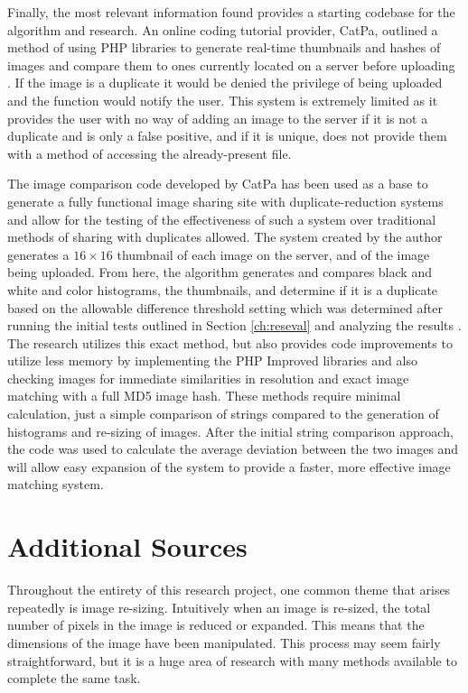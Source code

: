 Finally, the most relevant information found provides a starting codebase for the algorithm and research. An online coding tutorial provider, CatPa, outlined a method of using PHP libraries to generate real-time thumbnails and hashes of images and compare them to ones currently located on a server before uploading \cite{catpa:gdcode}. If the image is a duplicate it would be denied the privilege of being uploaded and the function would notify the user. This system is extremely limited as it provides the user with no way of adding an image to the server if it is not a duplicate and is only a false positive, and if it is unique, does not provide them with a method of accessing the already-present file.

The image comparison code developed by CatPa has been used as a base to generate a fully functional image sharing site with duplicate-reduction systems and allow for the testing of the effectiveness of such a system over traditional methods of sharing with duplicates allowed. The system created by the author \cite{catpa:gdcode} generates a $16\times 16$ thumbnail of each image on the server, and of the image being uploaded. From here, the algorithm generates and compares black and white and color histograms, the thumbnails, and determine if it is a duplicate based on the allowable difference threshold setting which was determined after running the initial tests outlined in Section \ref{ch:reseval} and analyzing the results \cite{catpa:gdcode}. The research utilizes this exact method, but also provides code improvements to utilize less memory by implementing the PHP Improved libraries and also checking images for immediate similarities in resolution and exact image matching with a full MD5 image hash. These methods require minimal calculation, just a simple comparison of strings compared to the generation of histograms and re-sizing of images. After the initial string comparison approach, the code was used to calculate the average deviation between the two images and will allow easy expansion of the system to provide a faster, more effective image matching system.

\section{Additional Sources}
Throughout the entirety of this research project, one common theme that arises repeatedly is image re-sizing. Intuitively when an image is re-sized, the total number of pixels in the image is reduced or expanded. This means that the dimensions of the image have been manipulated. This process may seem fairly straightforward, but it is a huge area of research with many methods available to complete the same task.  